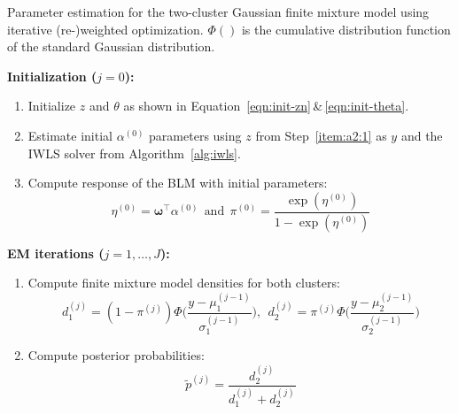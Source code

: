 \documentclass[article,nojss,shortnames]{jss}
\begin{document}
\begin{algorithm}
    \caption{Parameter estimation for the two-cluster Gaussian finite mixture model
    using iterative (re-)weighted optimization. $\Phi()$ is the cumulative distribution
    function of the standard Gaussian distribution.}
    
    \textbf{Initialization ($j = 0$):}
    \begin{enumerate}
        \item Initialize $\mathit{z}$ and $\mathit{\theta}$ as shown in
            Equation~\ref{eqn:init-zn}\,\&\,\ref{eqn:init-theta}.\label{item:a2:1}

        \item Estimate initial $\alpha^{(0)}$ parameters using $\mathit{z}$ from
            Step~\ref{item:a2:1} as $\mathit{y}$ and the IWLS solver from
            Algorithm~\ref{alg:iwls}.

        \item Compute response of the BLM with initial parameters:
            \begin{equation*}
                \mathit{\eta}^{(0)} = \mathbf{\omega}^\top \mathit{\alpha}^{(0)}
                ~~\text{and}~~
                \mathit{\pi}^{(0)} = \frac{\exp(\mathit{\eta}^{(0)})}{1 - \exp(\mathit{\eta}^{(0)})}
            \end{equation*}
    \end{enumerate}

    \textbf{EM iterations ($j = 1, \dots, J$):}
    \begin{enumerate}

        \item Compute finite mixture model densities for both clusters:
            \begin{equation*}
                    d_1^{(j)} = (1 - \mathit{\pi}^{(j)}) \Phi\Big(\frac{\mathit{y} - \mu_1^{(j-1)}}{\sigma_1^{(j-1)}}\Big),
                    ~~
                    d_2^{(j)} = \mathit{\pi}^{(j)} \Phi\Big(\frac{\mathit{y} - \mu_2^{(j-1)}}{\sigma_2^{(j-1)}}\Big)
            \end{equation*}

        \item Compute posterior probabilities:
            \begin{equation*}
                \tilde{\mathit{p}}^{(j)} = \frac{d_2^{(j)}}{d_1^{(j)} + d_2^{(j)}}
            \end{equation*}


\end{enumerate}
\end{algorithm}
\end{document}
